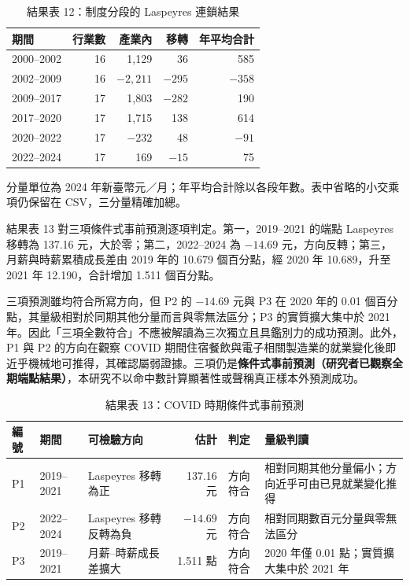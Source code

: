 \documentclass[12pt]{article}
\begin{document}
\begin{table}[htbp]
\caption{結果表 12：制度分段的 Laspeyres 連鎖結果}
\centering\small
\begin{tabular}{lrrrr}
\toprule
期間 & 行業數 & 產業內 & 移轉 & 年平均合計\\
\midrule
2000--2002 & 16 & 1,129 & 36 & 585\\
2002--2009 & 16 & $-2,211$ & $-295$ & $-358$\\
2009--2017 & 17 & 1,803 & $-282$ & 190\\
2017--2020 & 17 & 1,715 & 138 & 614\\
2020--2022 & 17 & $-232$ & 48 & $-91$\\
2022--2024 & 17 & 169 & $-15$ & 75\\
\bottomrule
\end{tabular}
\begin{tabnote}
分量單位為 2024 年新臺幣元／月；年平均合計除以各段年數。表中省略的小交乘項仍保留在 CSV，三分量精確加總。
\end{tabnote}
\end{table}

結果表 13 對三項條件式事前預測逐項判定。第一，2019--2021 的端點 Laspeyres 移轉為 137.16 元，大於零；第二，2022--2024 為 $-14.69$ 元，方向反轉；第三，月薪與時薪累積成長差由 2019 年的 10.679 個百分點，經 2020 年 10.689，升至 2021 年 12.190，合計增加 1.511 個百分點。

三項預測雖均符合所寫方向，但 P2 的 $-14.69$ 元與 P3 在 2020 年的 0.01 個百分點，其量級相對於同期其他分量而言與零無法區分；P3 的實質擴大集中於 2021 年。因此「三項全數符合」不應被解讀為三次獨立且具鑑別力的成功預測。此外，P1 與 P2 的方向在觀察 COVID 期間住宿餐飲與電子相關製造業的就業變化後即近乎機械地可推得，其確認屬弱證據。三項仍是\textbf{條件式事前預測（研究者已觀察全期端點結果）}，本研究不以命中數計算顯著性或聲稱真正樣本外預測成功。

\begin{table}[htbp]
\caption{結果表 13：COVID 時期條件式事前預測}
\centering\small
\begin{tabularx}{\textwidth}{p{0.7cm}p{1.8cm}Xrp{1.2cm}p{3.5cm}}
\toprule
編號 & 期間 & 可檢驗方向 & 估計 & 判定 & 量級判讀\\
\midrule
P1 & 2019--2021 & Laspeyres 移轉為正 & 137.16 元 & 方向符合 & 相對同期其他分量偏小；方向近乎可由已見就業變化推得\\
P2 & 2022--2024 & Laspeyres 移轉反轉為負 & $-14.69$ 元 & 方向符合 & 相對同期數百元分量與零無法區分\\
P3 & 2019--2021 & 月薪--時薪成長差擴大 & 1.511 點 & 方向符合 & 2020 年僅 0.01 點；實質擴大集中於 2021 年\\
\bottomrule
\end{tabularx}
\end{table}
\end{document}
